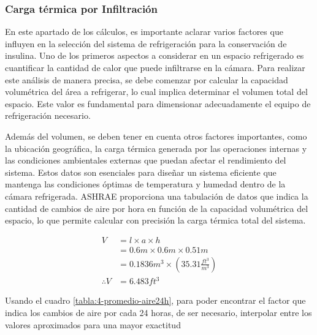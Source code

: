 \subsubsection{Carga térmica por Infiltración}
En este apartado de los cálculos, es importante aclarar varios factores que influyen en la selección del sistema de refrigeración para la conservación de insulina. Uno de los primeros aspectos a considerar en un espacio refrigerado es cuantificar la cantidad de calor que puede infiltrarse en la cámara. Para realizar este análisis de manera precisa, se debe comenzar por calcular la capacidad volumétrica del área a refrigerar, lo cual implica determinar el volumen total del espacio. Este valor es fundamental para dimensionar adecuadamente el equipo de refrigeración necesario.

Además del volumen, se deben tener en cuenta otros factores importantes, como la ubicación geográfica, la carga térmica generada por las operaciones internas y las condiciones ambientales externas que puedan afectar el rendimiento del sistema. Estos datos son esenciales para diseñar un sistema eficiente que mantenga las condiciones óptimas de temperatura y humedad dentro de la cámara refrigerada. ASHRAE proporciona una tabulación de datos que indica la cantidad de cambios de aire por hora en función de la capacidad volumétrica del espacio, lo que permite calcular con precisión la carga térmica total del sistema. 
 
 \begin{equation}
 	\begin{aligned}
 		V&=l\times a\times h\\
 		&=0.6m \times 0.6m\times 0.51m\\
 		&=0.1836 m^3 \times \left(35.31 \frac{ft^3}{m^3}\right)\\
  \therefore V&= 6.483 ft^3 
 	\end{aligned}
 \end{equation}
 
 Usando el cuadro \ref{tabla:4-promedio-aire24h}, para poder encontrar el factor que indica los cambios de aire por cada  24 horas, de ser necesario, interpolar entre los valores aproximados para una mayor  exactitud
 
